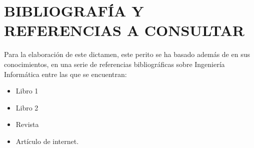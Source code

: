 \section{BIBLIOGRAFÍA Y REFERENCIAS A CONSULTAR}

Para la elaboración de este dictamen, este perito se ha basado además de en sus conocimientos, en una serie de referencias bibliográficas sobre Ingeniería Informática entre las que se encuentran:

\begin{itemize}[leftmargin=1.5em]
    \item Libro 1
    \item Libro 2
    \item Revista
    \item Artículo de internet.
\end{itemize}
